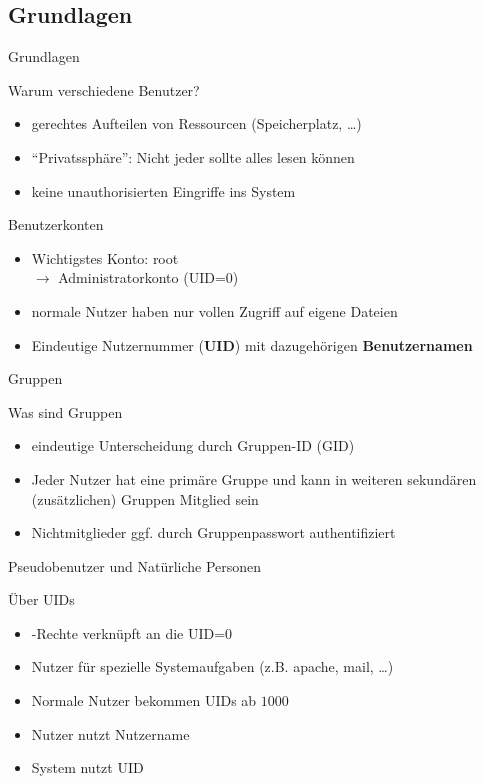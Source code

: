 \documentclass[aspectratio=43]{beamer}
\begin{document}
\subsection{Grundlagen}
\begin{frame}{Grundlagen}
  \begin{block}{Warum verschiedene Benutzer?}
    \begin{itemize}
      \item gerechtes Aufteilen von Ressourcen (Speicherplatz, \dots)
      \item "`Privatssphäre"': Nicht jeder sollte alles lesen können
      \item keine unauthorisierten Eingriffe ins System
    \end{itemize}
  \end{block}
  \begin{block}{Benutzerkonten}
    \begin{itemize}
      \item Wichtigstes Konto: root \\$\rightarrow$ Administratorkonto (UID=0)
      \item normale Nutzer haben nur vollen Zugriff auf eigene Dateien
      \item Eindeutige Nutzernummer (\textbf{UID}) mit dazugehörigen \textbf{Benutzernamen}
    \end{itemize}
  \end{block}
\end{frame}

\begin{frame}{Gruppen}
  \begin{block}{Was sind Gruppen}
    \begin{itemize}
      \item eindeutige Unterscheidung durch Gruppen-ID (GID)
      \item Jeder Nutzer hat eine primäre Gruppe
            und kann in weiteren sekundären (zusätzlichen) Gruppen Mitglied sein
      \item Nichtmitglieder ggf. durch Gruppenpasswort authentifiziert
    \end{itemize}
  \end{block}
\end{frame}

\begin{frame}{Pseudobenutzer und Natürliche Personen}
  \begin{block}{Über UIDs}
    \begin{itemize}
      \item {}-Rechte verknüpft an die UID=0
      \item Nutzer für spezielle Systemaufgaben (z.B. apache, mail, \dots)
      \item Normale Nutzer bekommen UIDs ab $1000$
      \item Nutzer nutzt Nutzername
      \item System nutzt UID
    \end{itemize}
  \end{block}
\end{frame}
\end{document}
